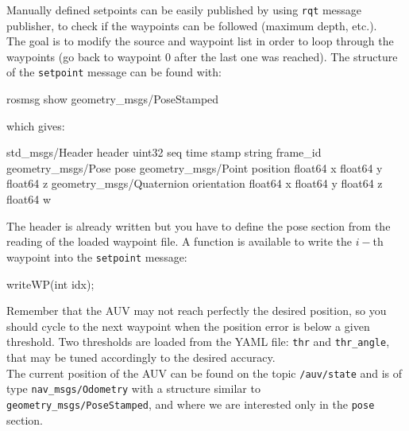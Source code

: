\documentclass{ecnreport}
\begin{document}
Manually defined setpoints can be easily published by using \texttt{rqt} message publisher, to check if the waypoints can be followed (maximum depth, etc.).\\

The goal is to modify the source and waypoint list in order to loop through the waypoints (go back to waypoint 0 after the last one was reached).
The structure of the \texttt{setpoint} message can be found with:
\begin{bashcodelarge}
rosmsg show geometry_msgs/PoseStamped
\end{bashcodelarge}
which gives:
\begin{bashcodelarge}
std_msgs/Header header
  uint32 seq
  time stamp
  string frame_id
geometry_msgs/Pose pose
  geometry_msgs/Point position
    float64 x
    float64 y
    float64 z
  geometry_msgs/Quaternion orientation
    float64 x
    float64 y
    float64 z
    float64 w
\end{bashcodelarge}
The header is already written but you have to define the pose section from the reading of the loaded waypoint file.
A function is available to write the $i-$th waypoint into the \texttt{setpoint} message:
\begin{cppcodelarge}
writeWP(int idx);
\end{cppcodelarge}
Remember that the AUV may not reach perfectly the desired position, so you should cycle to the next waypoint when the position error is below a given threshold.
Two thresholds are loaded from the YAML file: \texttt{thr} and \texttt{thr\_angle}, that may be tuned accordingly to the desired accuracy.\\
The current position of the AUV can be found on the topic \texttt{/auv/state} and is of type \texttt{nav\_msgs/Odometry} with a structure similar to \texttt{geometry\_msgs/PoseStamped}, and where we are interested only
in the \texttt{pose} section.\\


%
\end{document}
